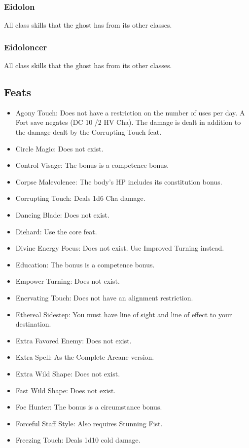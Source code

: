 \subsubsection{Eidolon}
 All class skills that the ghost has from its other classes.
\subsubsection{Eidoloncer}
 All class skills that the ghost has from its other classes.
\subsection{Feats}
\begin{itemize}
\item Agony Touch: Does not have a restriction on the number of uses per day. A Fort save negates (DC 10 /2 HV \add Cha). The damage is dealt in addition to the damage dealt by the Corrupting Touch feat.
\item Circle Magic: Does not exist.
\item Control Visage: The bonus is a competence bonus. 
\item Corpse Malevolence: The body's HP includes its constitution bonus.
\item Corrupting Touch: Deals 1d6 \add Cha damage.
\item Dancing Blade: Does not exist.
\item Diehard: Use the core feat.
\item Divine Energy Focus: Does not exist. Use Improved Turning instead.
\item Education: The bonus is a competence bonus.
\item Empower Turning: Does not exist.
\item Enervating Touch: Does not have an alignment restriction.
\item Ethereal Sidestep: You must have line of sight and line of effect to your destination.
\item Extra Favored Enemy: Does not exist.
\item Extra Spell: As the Complete Arcane version.
\item Extra Wild Shape: Does not exist.
\item Fast Wild Shape: Does not exist.
\item Foe Hunter: The bonus is a circumstance bonus.
\item Forceful Staff Style: Also requires Stunning Fist.
\item Freezing Touch: Deals 1d10 cold damage.

\end{itemize}
